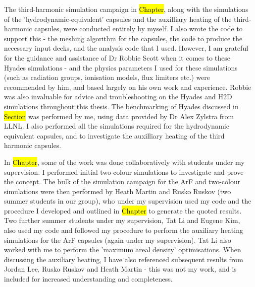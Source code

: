 The third-harmonic simulation campaign in \hl{Chapter}, along with the simulations of the 'hydrodynamic-equivalent' capsules and the auxilliary heating of the third-harmonic capsules, were conducted entirely by myself. I also wrote the code to support this - the meshing algorithm for the capsules, the code to produce the necessary input decks, and the analysis code that I used. However, I am grateful for the guidance and assistance of Dr Robbie Scott when it comes to these Hyades simulations - and the physics parameters I used for these simulations (such as radiation groups, ionisation models, flux limiters etc.) were recommended by him, and based largely on his own work and experience. Robbie was also invaluable for advice and troubleshooting on the Hyades and H2D simulations throughout this thesis. The benchmarking of Hyades discussed in \hl{Section} was performed by me, using data provided by Dr Alex Zylstra from LLNL. I also performed all the simulations required for the hydrodynamic equivalent capsules, and to investigate the auxilliary heating of the third harmonic capsules.

In \hl{Chapter}, some of the work was done collaboratively with students under my supervision. I performed initial two-colour simulations to investigate and prove the concept. The bulk of the simulation campaign for the ArF and two-colour simulations were then performed by Heath Martin and Rusko Ruskov (two summer students in our group), who under my supervision used my code and the procedure I developed and outlined in \hl{Chapter} to generate the quoted results. Two further summer students under my supervision, Tat Li and Eugene Kim, also used my code and followed my procedure to perform the auxiliary heating simulations for the ArF capsules (again under my supervision). Tat Li also worked with me  to perform the 'maximum areal density' optimisations. When discussing the auxiliary heating, I have also referenced subsequent results from Jordan Lee, Rusko Ruskov and Heath Martin - this was not my work, and is included for increased understanding and completeness.

